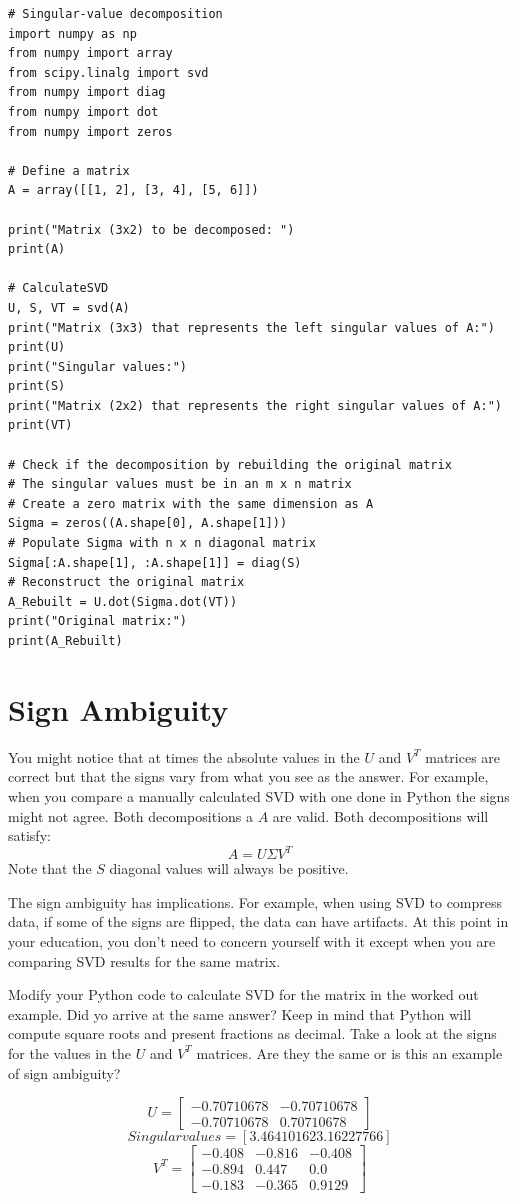 \begin{Verbatim}
# Singular-value decomposition
import numpy as np
from numpy import array
from scipy.linalg import svd
from numpy import diag
from numpy import dot
from numpy import zeros

# Define a matrix
A = array([[1, 2], [3, 4], [5, 6]])

print("Matrix (3x2) to be decomposed: ")
print(A)

# CalculateSVD
U, S, VT = svd(A)
print("Matrix (3x3) that represents the left singular values of A:")
print(U)
print("Singular values:")
print(S)
print("Matrix (2x2) that represents the right singular values of A:")
print(VT)

# Check if the decomposition by rebuilding the original matrix
# The singular values must be in an m x n matrix 
# Create a zero matrix with the same dimension as A
Sigma = zeros((A.shape[0], A.shape[1]))
# Populate Sigma with n x n diagonal matrix
Sigma[:A.shape[1], :A.shape[1]] = diag(S)
# Reconstruct the original matrix
A_Rebuilt = U.dot(Sigma.dot(VT))
print("Original matrix:")
print(A_Rebuilt)
\end{Verbatim}

\section{Sign Ambiguity}
You might notice that at times the absolute values in the $U$ and $V^T$ matrices are correct but that the signs vary from what you see as the answer. For example, when you compare a manually calculated SVD with one done in Python the signs might not agree. Both decompositions a $A$ are valid. Both decompositions will satisfy:
$$A = U \Sigma V^T$$
Note that the $S$ diagonal values will always be positive. 

The sign ambiguity has implications. For example, when using SVD to compress data, if some of the signs are flipped, the data can have artifacts. At this point in your education, you don't need to concern yourself with it except when you are comparing SVD results for the same matrix.

\begin{Exercise}[title={Single Value Decomposition}, label=svd]
Modify your Python code to calculate SVD for the matrix in the worked out example. Did yo arrive at the same answer? Keep in mind that Python will compute square roots and present fractions as decimal. Take a look at the signs for the values in the $U$ and $V^T$ matrices. Are they the same or is this an example of sign ambiguity? 
\end{Exercise}
\begin{Answer}[ref=svd]
$$U = 
\begin{bmatrix}
-0.70710678 & -0.70710678  \\
 -0.70710678 & 0.70710678 
\end{bmatrix}
$$
$$Singular values = [3.46410162 3.16227766]
$$
$$V^T =
\begin{bmatrix}
 -0.408 & -0.816 & -0.408  \\
 -0.894 & 0.447 & 0.0  \\
 -0.183 & -0.365  & 0.9129 
\end{bmatrix}
$$
\end{Answer}

